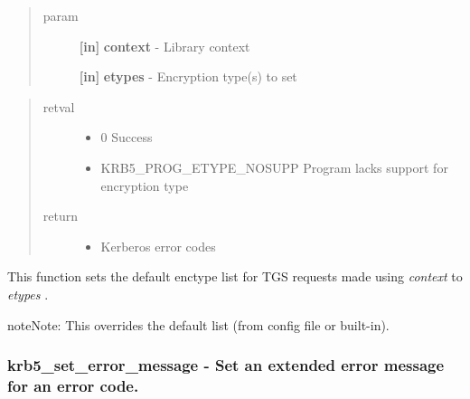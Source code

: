 \documentclass[letterpaper,10pt,english]{sphinxmanual}
\begin{document}
\begin{fulllineitems}
\label{appdev/refs/api/krb5_set_default_tgs_enctypes:c.krb5_set_default_tgs_enctypes}
\end{fulllineitems}

\begin{quote}\begin{description}
\item[{param}] \leavevmode
\textbf{{[}in{]}} \textbf{context} - Library context

\textbf{{[}in{]}} \textbf{etypes} - Encryption type(s) to set

\end{description}\end{quote}
\begin{quote}\begin{description}
\item[{retval}] \leavevmode\begin{itemize}
\item {} 
0   Success

\item {} 
KRB5\_PROG\_ETYPE\_NOSUPP   Program lacks support for encryption type

\end{itemize}

\item[{return}] \leavevmode\begin{itemize}
\item {} 
Kerberos error codes

\end{itemize}

\end{description}\end{quote}

This function sets the default enctype list for TGS requests made using \emph{context} to \emph{etypes} .

\begin{notice}{note}{Note:}
This overrides the default list (from config file or built-in).
\end{notice}


\subsubsection{krb5\_set\_error\_message -  Set an extended error message for an error code.}
\label{appdev/refs/api/krb5_set_error_message::doc}\label{appdev/refs/api/krb5_set_error_message:krb5-set-error-message-set-an-extended-error-message-for-an-error-code}
\end{document}
